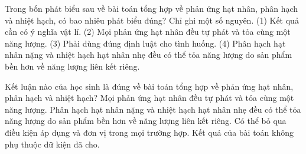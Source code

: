 \begin{ex}
Trong bốn phát biểu sau về bài toán tổng hợp về phản ứng hạt nhân, phân hạch và nhiệt hạch, có bao nhiêu phát biểu đúng? Chỉ ghi một số nguyên. (1) Kết quả cần có ý nghĩa vật lí. (2) Mọi phản ứng hạt nhân đều tự phát và tỏa cùng một năng lượng. (3) Phải dùng đúng định luật cho tình huống. (4) Phân hạch hạt nhân nặng và nhiệt hạch hạt nhân nhẹ đều có thể tỏa năng lượng do sản phẩm bền hơn về năng lượng liên kết riêng.
\end{ex}

\begin{ex}
Kết luận nào của học sinh là đúng về bài toán tổng hợp về phản ứng hạt nhân, phân hạch và nhiệt hạch?
\choice
{Mọi phản ứng hạt nhân đều tự phát và tỏa cùng một năng lượng.}
{\True Phân hạch hạt nhân nặng và nhiệt hạch hạt nhân nhẹ đều có thể tỏa năng lượng do sản phẩm bền hơn về năng lượng liên kết riêng.}
{Có thể bỏ qua điều kiện áp dụng và đơn vị trong mọi trường hợp.}
{Kết quả của bài toán không phụ thuộc dữ kiện đã cho.}
\end{ex}

